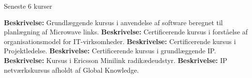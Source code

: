 \begin{rubric}{Seneste 6 kurser}

%
\entry*[dec 2012] \textbf{Beskrivelse:} Grundlæggende kursus i anvendelse af software beregnet til planlægning af Microwave links.
%
\entry*[okt 2012] \textbf{Beskrivelse:} Certificerende kursus i forståelse af organisationsmodel for IT-virksomheder.
%
\entry*[mar 2011] \textbf{Beskrivelse:} Certificerende kursus i Projektledelse.
%
\entry*[nov 2010] \textbf{Beskrivelse:} Certificerende kursus i grundlæggende IP.
%
\entry*[sep 2009] \textbf{Beskrivelse:} Kursus i Ericsson Minilink radikædeudstyr.
%
\entry*[jun 2009] \textbf{Beskrivelse:} IP netværkskursus afholdt af Global Knowledge. 
\end{rubric}
